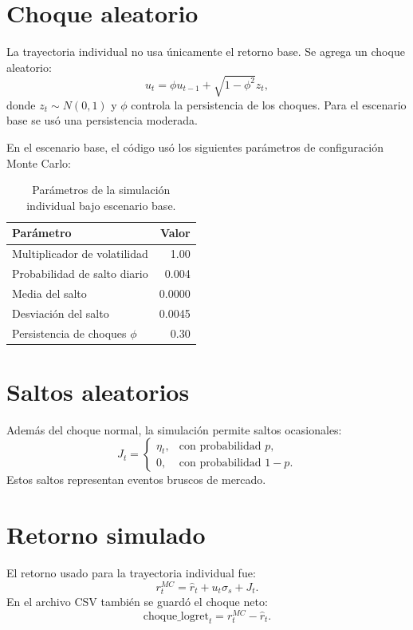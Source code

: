 \documentclass[12pt,letterpaper]{article}
\begin{document}
\section{Choque aleatorio}
La trayectoria individual no usa únicamente el retorno base. Se agrega un choque aleatorio:
\begin{equation}
u_t=\phi u_{t-1}+\sqrt{1-\phi^2}z_t,
\end{equation}
donde $z_t\sim N(0,1)$ y $\phi$ controla la persistencia de los choques. Para el escenario base se usó una persistencia moderada.

En el escenario base, el código usó los siguientes parámetros de configuración Monte Carlo:
\begin{table}[H]
\centering
\caption{Parámetros de la simulación individual bajo escenario base.}
\begin{tabular}{lr}
\toprule
Parámetro & Valor \\
\midrule
Multiplicador de volatilidad & 1.00 \\
Probabilidad de salto diario & 0.004 \\
Media del salto & 0.0000 \\
Desviación del salto & 0.0045 \\
Persistencia de choques $\phi$ & 0.30 \\
\bottomrule
\end{tabular}
\end{table}

\section{Saltos aleatorios}
Además del choque normal, la simulación permite saltos ocasionales:
\begin{equation}
J_t=\begin{cases}
\eta_t, & \text{con probabilidad } p,\\
0, & \text{con probabilidad } 1-p.
\end{cases}
\end{equation}
Estos saltos representan eventos bruscos de mercado.

\section{Retorno simulado}
El retorno usado para la trayectoria individual fue:
\begin{equation}
r_t^{MC}=\hat{r}_t+u_t\sigma_s+J_t.
\end{equation}
En el archivo CSV también se guardó el choque neto:
\begin{equation}
\text{choque\_logret}_t=r_t^{MC}-\hat{r}_t.
\end{equation}
\end{document}
